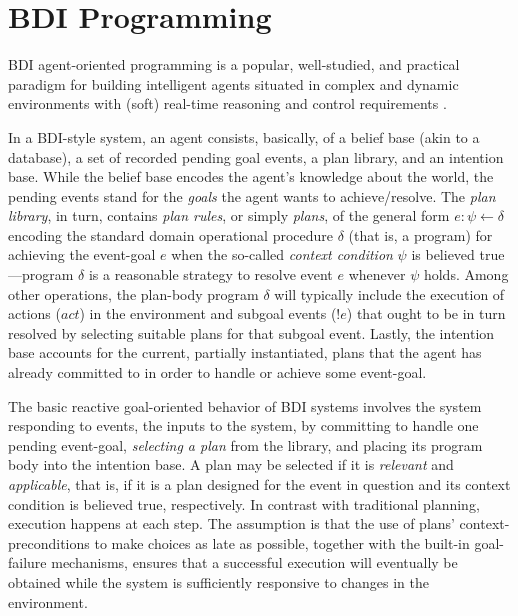 \section{BDI Programming}\label{sec:preliminaries}

BDI agent-oriented programming is a popular, well-studied, and practical paradigm
for building intelligent agents situated in complex and dynamic environments with
(soft) real-time reasoning and control requirements
\cite{Georgeff89-PRS,Benfield:AAMAS06}.

In a BDI-style system, an agent consists, basically, of a belief base (akin to a
database), a set of recorded pending goal events, a plan library, and an
intention base. While the belief base encodes the agent's knowledge about the
world, the pending events stand for the \emph{goals} the agent wants to
achieve/resolve.
The \textit{plan library}, in turn, contains \emph{plan rules}, or simply
\emph{plans}, of the general form $e: \psi \leftarrow \delta$ encoding the
standard domain operational procedure $\delta$ (that is, a program) for achieving
the event-goal $e$ when the so-called \textit{context condition} $\psi$ is
believed true---program $\delta$ is a reasonable strategy to resolve event $e$
whenever $\psi$ holds. Among other operations, the plan-body program $\delta$
will typically include the execution of actions ($act$) in the environment and
subgoal events ($!e$) that ought to be in turn resolved by selecting suitable
plans for that subgoal event. Lastly, the intention base accounts for the
current, partially instantiated, plans that the agent has already committed to in
order to handle or achieve some event-goal.


The basic reactive goal-oriented behavior of BDI systems involves the system
responding to events, the inputs to the system, by committing to handle one
pending event-goal, \textit{selecting a plan} from the library, and placing its
program body  into the intention base.
A plan may be selected if it is \textit{relevant} and \textit{applicable}, that is, if it
is a plan designed for the event in question and its context condition is
believed true, respectively.
In contrast with traditional planning, execution happens at each step. The
assumption is that the use of plans' context-preconditions to make choices as
late as possible, together with the built-in goal-failure mechanisms, ensures
that a successful execution will eventually be obtained while the system is
sufficiently responsive to changes in the environment.


